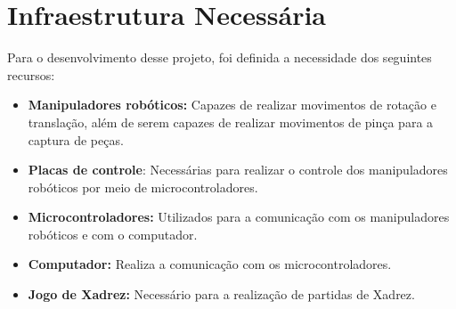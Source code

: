 \chapter[Infraestrutura Necessária]{Infraestrutura Necessária}
\label{cap:infraestrutura_necessaria}

Para o desenvolvimento desse projeto, foi definida a necessidade dos seguintes recursos:

\begin{itemize}
    \item \textbf{Manipuladores robóticos:} Capazes de realizar movimentos de rotação e translação, além de serem capazes de realizar movimentos de pinça para a captura de peças.
    \item \textbf{Placas de controle}: Necessárias para realizar o controle dos manipuladores robóticos por meio de microcontroladores.
    \item \textbf{Microcontroladores:} Utilizados para a comunicação com os manipuladores robóticos e com o computador.
    \item \textbf{Computador:} Realiza a comunicação com os microcontroladores.
    \item \textbf{Jogo de Xadrez:} Necessário para a realização de partidas de Xadrez.
\end{itemize}
